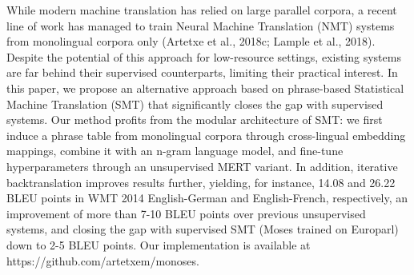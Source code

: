 While modern machine translation has relied on large parallel corpora, a recent line of work has managed to train Neural Machine Translation (NMT) systems from monolingual corpora only (Artetxe et al., 2018c; Lample et al., 2018). Despite the potential of this approach for low-resource settings, existing systems are far behind their supervised counterparts, limiting their practical interest. In this paper, we propose an alternative approach based on phrase-based Statistical Machine Translation (SMT) that significantly closes the gap with supervised systems. Our method profits from the modular architecture of SMT: we first induce a phrase table from monolingual corpora through cross-lingual embedding mappings, combine it with an n-gram language model, and fine-tune hyperparameters through an unsupervised MERT variant. In addition, iterative backtranslation improves results further, yielding, for instance, 14.08 and 26.22 BLEU points in WMT 2014 English-German and English-French, respectively, an improvement of more than 7-10 BLEU points over previous unsupervised systems, and closing the gap with supervised SMT (Moses trained on Europarl) down to 2-5 BLEU points. Our implementation is available at https://github.com/artetxem/monoses.
